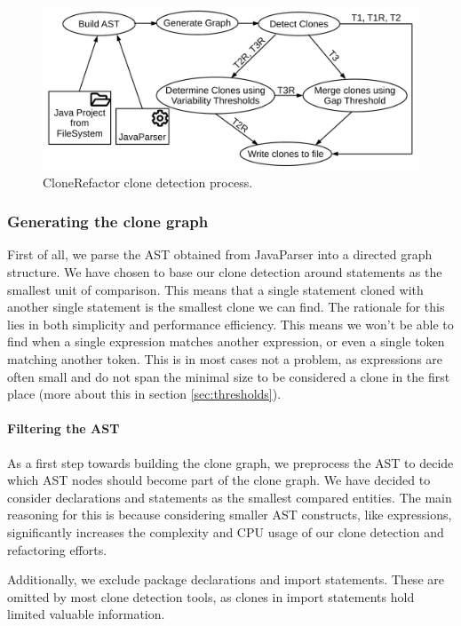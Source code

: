 \begin{figure}[H]
  \centering
  \includegraphics[width=1\columnwidth]{img/CloneDetection}
  \caption{CloneRefactor clone detection process.}
  \label{fig:clonedetection}
\end{figure}

\subsubsection{Generating the clone graph}\label{sec:clonegraph}
First of all, we parse the AST obtained from JavaParser into a directed graph structure. We have chosen to base our clone detection around statements as the smallest unit of comparison. This means that a single statement cloned with another single statement is the smallest clone we can find. The rationale for this lies in both simplicity and performance efficiency. This means we won't be able to find when a single expression matches another expression, or even a single token matching another token. This is in most cases not a problem, as expressions are often small and do not span the minimal size to be considered a clone in the first place (more about this in section \ref{sec:thresholds}).

\paragraph{Filtering the AST}
As a first step towards building the clone graph, we preprocess the AST to decide which AST nodes should become part of the clone graph. We have decided to consider declarations and statements as the smallest compared entities. The main reasoning for this is because considering smaller AST constructs, like expressions, significantly increases the complexity and CPU usage of our clone detection and refactoring efforts.

Additionally, we exclude package declarations and import statements. These are omitted by most clone detection tools, as clones in import statements hold limited valuable information.


